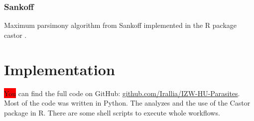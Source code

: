       \subsubsection{Sankoff}
        Maximum parsimony algorithm from Sankoff implemented in the R package castor \cite{Louca2017}. \\


  \section{Implementation}
    \colorbox{red}{You} can find the full code on GitHub: 
      \hyperlink{github.com/Irallia/IZW-HU-Parasites}{github.com/Irallia/IZW-HU-Parasites}. \\
    Most of the code was written in Python. The analyzes and the use of the Castor package in R. There 
      are some shell scripts to execute whole workflows.

